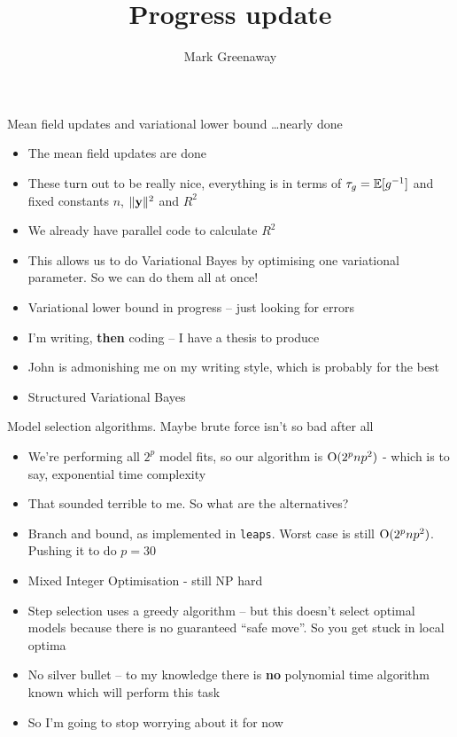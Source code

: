 \documentclass{beamer}
\title{Progress update}
\author{Mark Greenaway}
\begin{document}
\begin{frame}
\titlepage
\end{frame}

\begin{frame}{Mean field updates and variational lower bound \ldots nearly done}
\begin{itemize}
\item The mean field updates are done
\item These turn out to be really nice, everything is in terms of $\tau_g = \mathbb{E} [g^{-1}]$
			and fixed constants $n$, $\|{\bf y}\|^2$ and $R^2$
\item We already have parallel code	to calculate $R^2$
\item This allows us to do Variational Bayes by optimising one variational parameter. So we can do them all 
			at once!
\item Variational lower bound in progress -- just looking for errors
\item I'm writing, \textbf{then} coding -- I have a thesis to produce
\item John is admonishing me on my writing style, which is probably for the best
\item Structured Variational Bayes
\end{itemize}
\end{frame}

\begin{frame}{Model selection algorithms. Maybe brute force isn't so bad after all}
\begin{itemize}
\item We're performing all $2^p$ model fits, so our algorithm is $\text{O}(2^p n p^2)$ - which is to say,
			exponential time complexity
\item That sounded terrible to me. So what are the alternatives?
\item Branch and bound, as implemented in \texttt{leaps}. Worst case is still $\text{O}(2^p n p^2)$. Pushing it
			to do $p = 30$
\item Mixed Integer Optimisation - still NP hard
\item Step selection uses a greedy algorithm -- but this doesn't select optimal models because there is no
			guaranteed ``safe move''. So you get stuck in local optima
\item No silver bullet -- to my knowledge there is \textbf{no} polynomial time algorithm known which
			will perform this task
\item So I'm going to stop worrying about it for now
\end{itemize}
\end{frame}
\end{document}
